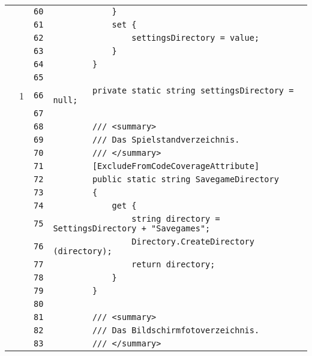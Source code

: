 \documentclass[a4paper,10pt]{article}
\begin{document}
\begin{longtable}[l]{lrrl}
\cellcolor{gray} &  & \verb~60~ & \verb~            }~\\
\cellcolor{gray} &  & \verb~61~ & \verb~            set {~\\
\cellcolor{gray} &  & \verb~62~ & \verb~                settingsDirectory = value;~\\
\cellcolor{gray} &  & \verb~63~ & \verb~            }~\\
\cellcolor{gray} &  & \verb~64~ & \verb~        }~\\
\cellcolor{gray} &  & \verb~65~ & \verb~~\\
\cellcolor{green} & 1 & \verb~66~ & \verb~        private static string settingsDirectory = null;~\\
\cellcolor{gray} &  & \verb~67~ & \verb~~\\
\cellcolor{gray} &  & \verb~68~ & \verb~        /// <summary>~\\
\cellcolor{gray} &  & \verb~69~ & \verb~        /// Das Spielstandverzeichnis.~\\
\cellcolor{gray} &  & \verb~70~ & \verb~        /// </summary>~\\
\cellcolor{gray} &  & \verb~71~ & \verb~        [ExcludeFromCodeCoverageAttribute]~\\
\cellcolor{gray} &  & \verb~72~ & \verb~        public static string SavegameDirectory~\\
\cellcolor{gray} &  & \verb~73~ & \verb~        {~\\
\cellcolor{gray} &  & \verb~74~ & \verb~            get {~\\
\cellcolor{gray} &  & \verb~75~ & \verb~                string directory = SettingsDirectory + "Savegames";~\\
\cellcolor{gray} &  & \verb~76~ & \verb~                Directory.CreateDirectory (directory);~\\
\cellcolor{gray} &  & \verb~77~ & \verb~                return directory;~\\
\cellcolor{gray} &  & \verb~78~ & \verb~            }~\\
\cellcolor{gray} &  & \verb~79~ & \verb~        }~\\
\cellcolor{gray} &  & \verb~80~ & \verb~~\\
\cellcolor{gray} &  & \verb~81~ & \verb~        /// <summary>~\\
\cellcolor{gray} &  & \verb~82~ & \verb~        /// Das Bildschirmfotoverzeichnis.~\\
\cellcolor{gray} &  & \verb~83~ & \verb~        /// </summary>~\\

\end{longtable}
\end{document}
